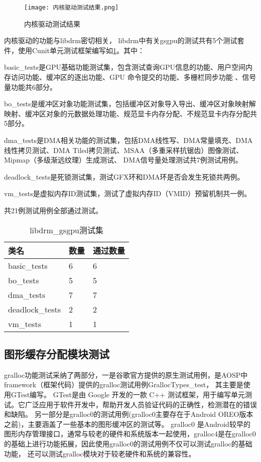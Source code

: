 \begin{figure}[H]
    \centering
    \texttt{[image: 内核驱动测试结果.png]}
    \caption{内核驱动测试结果}
    \label{fig:内核驱动测试结果}
\end{figure}

内核驱动的功能与libdrm密切相关，
libdrm中有关gsgpu的测试共有5个测试套件，使用Cunit单元测试框架编写如\ref{tab:libdrm_gsgpu测试集}。其中：

basic\_tests是GPU基础功能测试集，包含测试查询GPU信息的功能、用户空间内存访问功能、缓冲区的逐出功能、GPU 命令提交的功能、多栅栏同步功能 、信号量功能共6部分。

bo\_tests是缓冲区对象功能测试集，包括缓冲区对象导入导出、缓冲区对象映射解映射、缓冲区对象的元数据处理功能、规范显卡内存分配、不规范显卡内存分配共5部分。

dma\_tests是DMA相关功能的测试集，包括DMA线性写、DMA常量填充、DMA线性拷贝测试、DMA Tiled拷贝测试、MSAA（多重采样抗锯齿）图像测试、Mipmap（多级渐远纹理）生成测试、
DMA信号量处理测试共7例测试用例。

deadlock\_tests是死锁测试集，测试GFX环和DMA环是否会发生死锁共两例。

vm\_tests是虚拟内存ID测试集，测试了虚拟内存ID（VMID）预留机制共一例。

共21例测试用例全部通过测试。

\begin{table}[H]
    \centering
    \caption{libdrm\_gsgpu测试集}
    \label{tab:libdrm_gsgpu测试集}
    \begin{tabular}{lll}
      \toprule
      类名   &  数量  &通过数量\\
      \midrule
      basic\_tests & 6 & 6\\
      bo\_tests & 5 & 5\\
      dma\_tests & 7 & 7\\
      deadlock\_tests & 2 &2\\
      vm\_tests & 1 &1\\
      \bottomrule
    \end{tabular}
    \note{}
\end{table}

\subsection{图形缓存分配模块测试}
gralloc功能测试采纳了两部分，一是谷歌官方提供的原生测试用例，是AOSP中framework（框架代码）提供的gralloc测试用例GrallocTypes\_test，
其主要是使用GTest编写。
GTest\cite{GoogleTest}是由 Google 开发的一款 C++ 测试框架，用于编写单元测试。它广泛应用于软件开发中，帮助开发人员验证代码的正确性，检测潜在的错误和缺陷。
另一部分是gralloc0的测试用例(gralloc0主要存在于Android OREO版本之前)，主要涵盖了一些基本的图形缓冲区的测试等。
gralloc0 是Android较早的图形内存管理接口，通常与较老的硬件和系统版本一起使用，gralloc4是在gralloc0的基础上进行功能拓展，因此使用gralloc0的测试用例不仅可以测试gralloc的基础功能，
还可以测试gralloc模块对于较老硬件和系统的兼容性。

